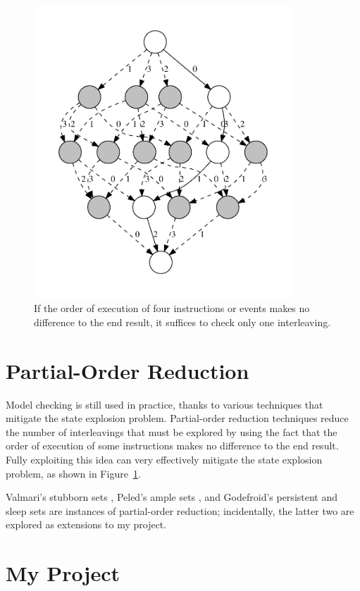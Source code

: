 \documentclass[12pt,a4paper,twoside,openany]{report}
\begin{document}
\begin{figure}
	\includegraphics*[height=11cm]{por}
	\caption[Illustration of partial-order reduction.]
	{If the order of execution of four instructions or
		events makes no difference to the end result, it
		suffices to check only one interleaving.}
	\label{fig:por}
\end{figure}

\section{Partial-Order Reduction}

Model checking is still used in practice, thanks
to various techniques that mitigate
the state explosion problem. Partial-order reduction
techniques reduce the number
of interleavings that must be explored
by using the fact that the order
of execution of some instructions makes
no difference to the end result.
Fully exploiting
this idea can very effectively mitigate the
state explosion problem, as shown in
Figure~\ref{fig:por}.

Valmari's stubborn sets \cite{val90},
Peled's ample sets \cite{pel94},
and Godefroid's persistent and sleep sets
\cite{god91} are
instances of partial-order reduction;
incidentally, the
latter two are explored as extensions to
my project.

\section{My Project}
\end{document}
